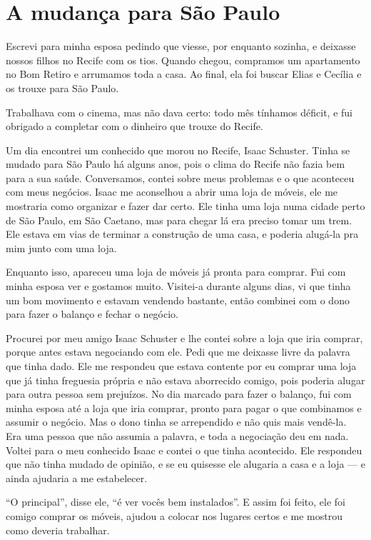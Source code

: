 \chapter{A mudança para São Paulo}

Escrevi para minha esposa pedindo que viesse, por enquanto sozinha, e
deixasse nossos filhos no Recife com os tios. Quando chegou, compramos 
um apartamento no Bom Retiro e arrumamos toda a casa. Ao final, ela foi 
buscar Elias e Cecília e os trouxe para São Paulo.

Trabalhava com o cinema, mas não dava certo: todo mês tínhamos  
déficit, e fui obrigado a completar com o dinheiro que trouxe do Recife.

Um dia encontrei um conhecido que morou no Recife, Isaac Schuster. 
Tinha se mudado para São Paulo há alguns anos, pois o clima do 
Recife não fazia bem para a sua saúde.
Conversamos, contei sobre meus problemas e o que aconteceu com meus negócios. Isaac me aconselhou a abrir uma loja
de móveis, ele me mostraria como organizar e fazer dar
certo. Ele tinha uma loja numa cidade perto de São Paulo, em São
Caetano, mas para chegar lá era preciso tomar um trem. Ele estava em vias de terminar a construção de uma casa, e poderia alugá-la pra mim junto com uma loja.

Enquanto isso, apareceu uma loja de móveis já pronta para comprar. 
Fui com minha esposa ver e gostamos muito. Visitei-a durante alguns
dias, vi que tinha um bom movimento e estavam vendendo bastante, então
combinei com o dono para fazer o balanço e fechar o negócio.

Procurei por meu amigo Isaac Schuster e lhe contei sobre a loja que
iria comprar, porque antes estava negociando com ele. Pedi que
me deixasse livre da palavra que tinha dado. Ele me respondeu que
estava contente por eu comprar uma loja que já tinha freguesia própria e não estava aborrecido comigo, pois poderia alugar para
outra pessoa sem prejuízos. No dia marcado para fazer o
balanço, fui com minha esposa até a loja que iria comprar, pronto
para pagar o que combinamos e assumir o negócio. Mas o dono
tinha se arrependido e não quis mais vendê-la. Era uma pessoa que
não assumia a palavra, e toda a negociação deu em nada. Voltei para o
meu conhecido Isaac e contei o que tinha acontecido. Ele respondeu que não tinha mudado de opinião, e se
eu quisesse ele alugaria a casa e a loja --- e ainda ajudaria a me
estabelecer.

``O principal'', disse ele, ``é ver vocês bem instalados''. E assim foi
feito, ele foi comigo comprar os móveis, ajudou a colocar nos lugares
certos e me mostrou como deveria trabalhar.

